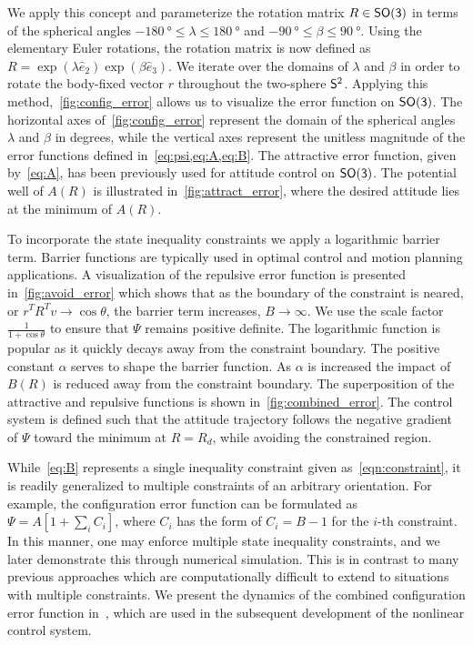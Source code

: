 We apply this concept and parameterize the rotation matrix \( R \in \SO \) in terms of the spherical angles \( \SI{-180}{\degree} \leq \lambda \leq \SI{180}{\degree}  \) and \( \SI{-90}{\degree} \leq \beta \leq \SI{90}{\degree} \). 
Using the elementary Euler rotations, the rotation matrix is now defined as \( R = \exp( \lambda \hat{e}_2) \exp( \beta \hat{e}_3) \).
We iterate over the domains of \( \lambda\) and \(\beta\) in order to rotate the body-fixed vector \( r \) throughout the two-sphere \( \S^2 \).
Applying this method,~\cref{fig:config_error} allows us to visualize the error function on \( \SO \).
The horizontal axes of~\cref{fig:config_error} represent the domain of the spherical angles \( \lambda \) and \( \beta \) in degrees, while the vertical axes represent the unitless magnitude of the error functions defined in~\cref{eq:psi,eq:A,eq:B}.
The attractive error function, given by~\cref{eq:A}, has been previously used for attitude control on \(\SO\).
The potential well of \( A(R)\) is illustrated in~\cref{fig:attract_error}, where the desired attitude lies at the minimum of \( A(R) \).

To incorporate the state inequality constraints we apply a logarithmic barrier term.
Barrier functions are typically used in optimal control and motion planning applications.
A visualization of the repulsive error function is presented in~\cref{fig:avoid_error} which shows that as the boundary of the constraint is neared, or \( r^T R^T v \to \cos \theta \), the barrier term increases, \( B \to \infty\).
We use the scale factor~\(\frac{1}{1+\cos \theta} \) to ensure that \( \Psi \) remains positive definite.
The logarithmic function is popular as it quickly decays away from the constraint boundary.
The positive constant \( \alpha \) serves to shape the barrier function.
As \( \alpha \) is increased the impact of \( B(R) \) is reduced away from the constraint boundary. 
The superposition of the attractive and repulsive functions is shown in~\cref{fig:combined_error}.
The control system is defined such that the attitude trajectory follows the negative gradient of \( \Psi \) toward the minimum at \( R = R_d \), while avoiding the constrained region.

While~\cref{eq:B} represents a single inequality constraint given as~\cref{eqn:constraint}, it is readily generalized to multiple constraints of an arbitrary orientation. 
For example, the configuration error function can be formulated as $\Psi=A[1+\sum_i C_i]$, where $C_i$ has the form of $C_i=B-1$ for the $i$-th constraint. 
In this manner, one may enforce multiple state inequality constraints, and we later demonstrate this through numerical simulation. 
This is in contrast to many previous approaches which are computationally difficult to extend to situations with multiple constraints.
We present the dynamics of the combined configuration error function in~, which are used in the subsequent development of the nonlinear control system.

